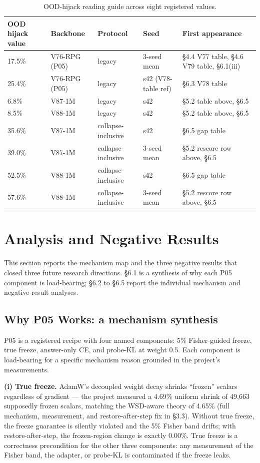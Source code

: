 \documentclass[11pt]{article}
\begin{document}
\begin{table}[!t]
\centering\footnotesize
\caption{OOD-hijack reading guide across eight registered values.}
\label{tab:ood-guide}
\begin{tabular}{lllll}
\toprule
OOD hijack value & Backbone & Protocol & Seed & First appearance \\
\midrule
17.5\% & V76-RPG (P05) & legacy & 3-seed mean & \S4.4 V77 table, \S4.6 V79 table, \S6.1(iii) \\
25.4\% & V76-RPG (P05) & legacy & s42 (V78-table ref) & \S6.3 V78 table \\
6.8\% & V87-1M & legacy & s42 & \S5.2 table above, \S6.5 \\
8.5\% & V88-1M & legacy & s42 & \S5.2 table above, \S6.5 \\
35.6\% & V87-1M & collapse-inclusive & s42 & \S6.5 gap table \\
39.0\% & V87-1M & collapse-inclusive & 3-seed mean & \S5.2 rescore row above, \S6.5 \\
52.5\% & V88-1M & collapse-inclusive & s42 & \S6.5 gap table \\
57.6\% & V88-1M & collapse-inclusive & 3-seed mean & \S5.2 rescore row above, \S6.5 \\
\bottomrule
\end{tabular}
\end{table}

\section{Analysis and Negative Results}

This section reports the mechanism map and the three negative results that closed three future research directions. \S6.1 is a synthesis of why each P05 component is load-bearing; \S6.2 to \S6.5 report the individual mechanism and negative-result analyses.

\subsection{Why P05 Works: a mechanism synthesis}

P05 is a registered recipe with four named components: 5\% Fisher-guided freeze, true freeze, answer-only CE, and probe-KL at weight 0.5. Each component is load-bearing for a specific mechanism reason grounded in the project's measurements.

\textbf{(i) True freeze.} AdamW's decoupled weight decay shrinks ``frozen'' scalars regardless of gradient --- the project measured a 4.69\% uniform shrink of 49{,}663 supposedly frozen scalars, matching the WSD-aware theory of 4.65\% (full mechanism, measurement, and restore-after-step fix in \S3.3). Without true freeze, the freeze guarantee is silently violated and the 5\% Fisher band drifts; with restore-after-step, the frozen-region change is exactly 0.00\%. True freeze is a correctness precondition for the other three components: any measurement of the Fisher band, the adapter, or probe-KL is contaminated if the freeze leaks.
\end{document}
